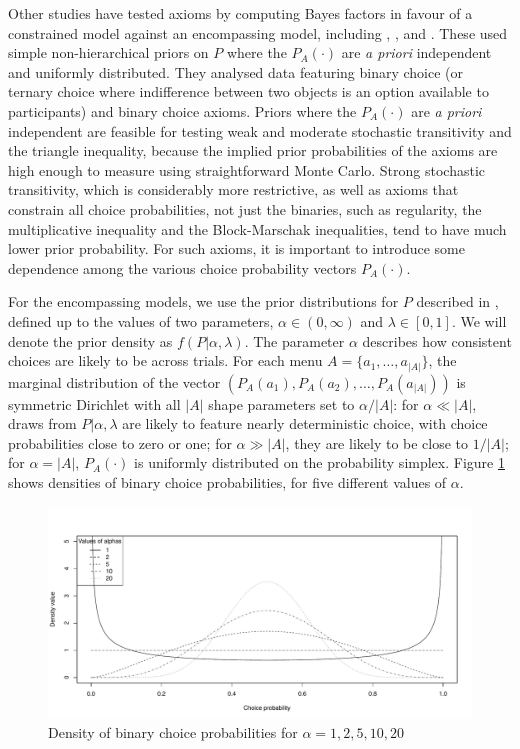 \documentclass[11pt,letter]{article}
\newcommand{\menu}{menu}
\begin{document}
Other studies have tested axioms by computing Bayes factors in favour of a constrained model against an encompassing model, including , ,  and .
These used simple non-hierarchical priors on $P$ where the $P_A(\cdot)$ are {\em a priori} independent and uniformly distributed.
They analysed data featuring binary choice (or ternary choice where indifference between two objects is an option available to participants) and binary choice axioms.
Priors where the $P_A(\cdot)$ are {\em a priori} independent are feasible for testing weak and moderate stochastic transitivity and the triangle inequality, because the implied prior probabilities of the axioms are high enough to measure using straightforward Monte Carlo.
Strong stochastic transitivity, which is considerably more restrictive, as well as axioms that constrain all choice probabilities, not just the binaries, such as regularity, the multiplicative inequality and the Block-Marschak inequalities, tend to have much lower prior probability.
For such axioms, it is important to introduce some dependence among the various choice probability vectors $P_A(\cdot)$.

For the encompassing models, we use the prior distributions for $P$ described in , defined up to the values of two parameters, $\alpha \in (0,\infty)$ and $\lambda \in [0,1]$.
We will denote the prior density as $f(P|\alpha,\lambda)$.
The parameter $\alpha$ describes how consistent choices are likely to be across trials.
For each \menu{} $A = \{a_1,\ldots,a_{|A|}\}$, the marginal distribution of the vector $(P_A(a_1), P_A(a_2), \ldots, P_A(a_{|A|}))$ is symmetric Dirichlet with all $|A|$ shape parameters set to $\alpha / |A|$: for $\alpha \ll |A|$, draws from $P|\alpha,\lambda$ are likely to feature nearly deterministic choice, with choice probabilities close to zero or one; for $\alpha \gg |A|$, they are likely to be close to $1/|A|$; for $\alpha = |A|$, $P_A(\cdot)$ is uniformly distributed on the probability simplex.
Figure \ref{f:bcp} shows densities of binary choice probabilities, for five different values of $\alpha$.

\begin{figure}
	\begin{center}
	\includegraphics[width=15cm]{Figures/bcp.pdf}
	\caption{Density of binary choice probabilities for $\alpha = 1, 2, 5, 10, 20$}\label{f:bcp}
	\end{center}
\end{figure}
\end{document}
